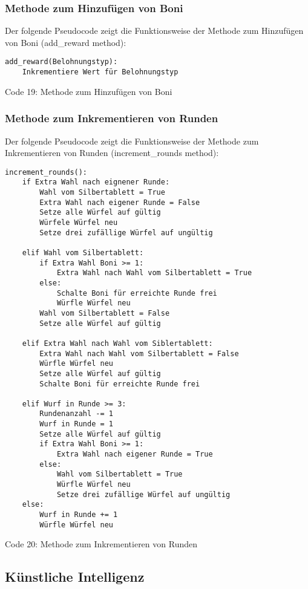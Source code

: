 \subsubsection{Methode zum Hinzufügen von Boni}
\begin{minipage}{\linewidth}
Der folgende Pseudocode zeigt die Funktionsweise der Methode zum Hinzufügen von Boni (add\_reward method):
\vspace{0.5cm}
\begin{lstlisting}
add_reward(Belohnungstyp):
	Inkrementiere Wert für Belohnungstyp
\end{lstlisting}
Code 19: Methode zum Hinzufügen von Boni\\
\end{minipage}

\subsubsection{Methode zum Inkrementieren von Runden}
Der folgende Pseudocode zeigt die Funktionsweise der Methode zum Inkrementieren von Runden (increment\_rounds method):
\vspace{0.5cm}
\begin{lstlisting}
increment_rounds():
	if Extra Wahl nach eignener Runde:
		Wahl vom Silbertablett = True
		Extra Wahl nach eigener Runde = False
		Setze alle Würfel auf gültig
		Würfele Würfel neu
		Setze drei zufällige Würfel auf ungültig
		
	elif Wahl vom Silbertablett:
		if Extra Wahl Boni >= 1:
			Extra Wahl nach Wahl vom Silbertablett = True
		else:
			Schalte Boni für erreichte Runde frei
			Würfle Würfel neu
		Wahl vom Silbertablett = False
		Setze alle Würfel auf gültig
	
	elif Extra Wahl nach Wahl vom Siblertablett:
		Extra Wahl nach Wahl vom Silbertablett = False
		Würfle Würfel neu
		Setze alle Würfel auf gültig
		Schalte Boni für erreichte Runde frei
	
	elif Wurf in Runde >= 3:
		Rundenanzahl -= 1
		Wurf in Runde = 1
		Setze alle Würfel auf gültig
		if Extra Wahl Boni >= 1:
			Extra Wahl nach eigener Runde = True
		else:
			Wahl vom Silbertablett = True
			Würfle Würfel neu
			Setze drei zufällige Würfel auf ungültig
	else:
		Wurf in Runde += 1
		Würfle Würfel neu
\end{lstlisting}
Code 20: Methode zum Inkrementieren von Runden\\

\subsection{Künstliche Intelligenz}
